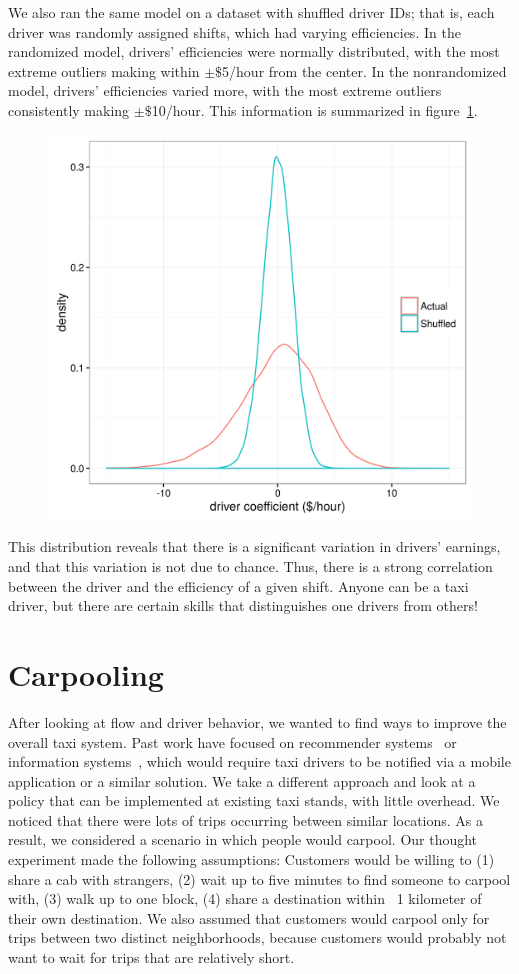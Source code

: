 \documentclass[twocolumn]{article}
\begin{document}
We also ran the same model on a dataset with shuffled driver IDs; that is, each driver was randomly assigned shifts, which had varying efficiencies. In the randomized model, drivers' efficiencies were normally distributed, with the most extreme outliers making within $\pm$$\$$5/hour from the center. In the nonrandomized model, drivers' efficiencies varied more, with the most extreme outliers consistently making $\pm$$\$$10/hour. This information is summarized in figure~\ref{fig:efficiency}.
\begin{figure}[h]
  \centering
  \includegraphics[width=.9\linewidth]{efficiency}
  \label{fig:efficiency}
\end{figure}
This distribution reveals that there is a significant variation in drivers’ earnings, and that this variation is not due to chance. Thus, there is a strong correlation between the driver and the efficiency of a given shift. Anyone can be a taxi driver, but there are certain skills that distinguishes one drivers from others! 
\section{Carpooling}
After looking at flow and driver behavior, we wanted to find ways to improve the overall taxi system. Past work have focused on recommender systems~\cite{ZHAN:2014} or information systems~\cite{KIM:2005}, which would require taxi drivers to be notified via a mobile application or a similar solution. We take a different approach and look at a policy that can be implemented at existing taxi stands, with little overhead. We noticed that there were lots of trips occurring between similar locations. As a result, we considered a scenario in which people would carpool. Our thought experiment made the following assumptions: Customers would be willing to (1) share a cab with strangers, (2) wait up to five minutes to find someone to carpool with, (3) walk up to one block, (4) share a destination within ~1 kilometer of their own destination. We also assumed that customers would carpool only for trips between two distinct neighborhoods, because customers would probably not want to wait for trips that are relatively short.
\end{document}

